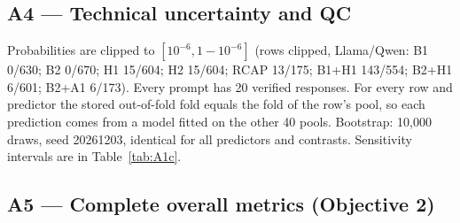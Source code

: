 \subsection*{A4 --- Technical uncertainty and QC}
Probabilities are clipped to $[10^{-6}, 1-10^{-6}]$ (rows clipped, Llama/Qwen: B1 0/630; B2 0/670; H1 15/604; H2 15/604; RCAP 13/175; B1+H1 143/554; B2+H1 6/601; B2+A1 6/173). Every prompt has 20 verified responses. For every row and predictor the stored out-of-fold fold equals the fold of the row's pool, so each prediction comes from a model fitted on the other 40 pools. Bootstrap: 10,000 draws, seed 20261203, identical for all predictors and contrasts. Sensitivity intervals are in Table~\ref{tab:A1c}.

\subsection*{A5 --- Complete overall metrics (Objective 2)}
